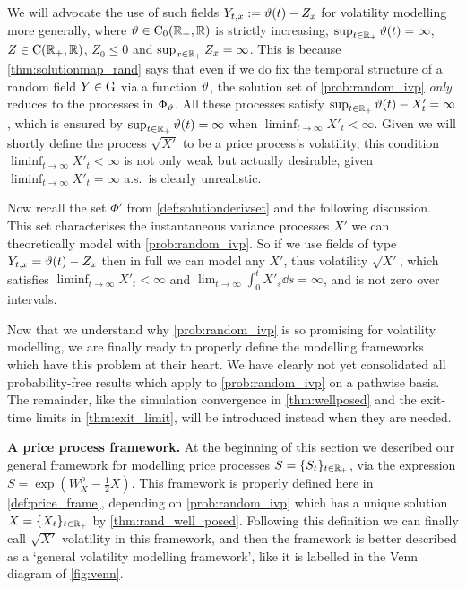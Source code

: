 We will advocate the use of such fields $Y_{t,x}:=\vartheta(t)-Z_x$ for volatility modelling more generally, where $\vartheta\in\mathrm{C}_0(\mathbb{R}_+,\mathbb{R})$ is strictly increasing, $\sup_{t\in\mathbb{R}_+}\vartheta(t)=\infty$, $Z\in\mathrm{C}(\mathbb{R}_+,\mathbb{R})$, $Z_0\le0$ and $\sup_{x\in\mathbb{R}_+}Z_x=\infty$. This is because \autoref{thm:solutionmap_rand} says that even if we do fix the temporal structure of a random field $Y\in\mathrm{G}$ via a function $\vartheta$, the solution set of \autoref{prob:random_ivp} \emph{only} reduces to the processes in $\Phi_\vartheta$. All these processes satisfy $\sup_{t\in\mathbb{R}_+}\vartheta(t)-X'_t=\infty$, which is ensured by $\sup_{t\in\mathbb{R}_+}\vartheta(t)=\infty$ when $\liminf_{t\to\infty}X'_t<\infty$. Given we will shortly define the process $\sqrt{X'}$ to be a price process's volatility, this condition $\liminf_{t\to\infty}X'_t<\infty$ is not only weak but actually desirable, given $\liminf_{t\to\infty}X'_t=\infty$ a.s.~is clearly unrealistic.

Now recall the set $\Phi'$ from \autoref{def:solutionderivset} and the following discussion. This set characterises the instantaneous variance processes $X'$ we can theoretically model with \autoref{prob:random_ivp}. So if we use fields of type $Y_{t,x}=\vartheta(t)-Z_x$ then in full we can model any $X'$, thus volatility $\sqrt{X'}$, which satisfies $\liminf_{t\to\infty}X'_t<\infty$ and $\lim_{t\to\infty}\int_0^t X'_s\dd s=\infty$, and is not zero over intervals.

Now that we understand why \autoref{prob:random_ivp} is so promising for volatility modelling, we are finally ready to properly define the modelling frameworks which have this problem at their heart. We have clearly not yet consolidated all probability-free results which apply to \autoref{prob:random_ivp} on a pathwise basis. The remainder, like the simulation convergence in \autoref{thm:wellposed} and the exit-time limits in \autoref{thm:exit_limit}, will be introduced instead when they are needed.

\vspace{3mm}\textbf{A price process framework.} At the beginning of this section we described our general framework for modelling price processes $S=\{S_t\}_{t\in\mathbb{R}_+}$, via the expression $S=\exp(W^\rho_X-\frac12 X)$. This framework is properly defined here in \autoref{def:price_frame}, depending on \autoref{prob:random_ivp} which has a unique solution $X=\{X_t\}_{t\in\mathbb{R}_+}$ by \autoref{thm:rand_well_posed}. Following this definition we can finally call $\sqrt{X'}$ volatility in this framework, and then the framework is better described as a `general volatility modelling framework', like it is labelled in the Venn diagram of \autoref{fig:venn}.

